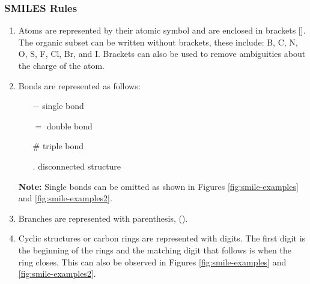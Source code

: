     \subsubsection{SMILES Rules}
        \begin{enumerate}
            \item Atoms are represented by their atomic symbol and are enclosed in brackets []. The organic subset can be written without brackets, these include: B, C, N, O, S, F, Cl, Br, and I. Brackets can also be used to remove ambiguities about the charge of the atom. 
            \item Bonds are represented as follows:
            \begin{itemize}
                \item[$-$] single bond
                \item[$=$] double bond
                \item[$\#$] triple bond
                \item[$.$] disconnected structure
            \end{itemize}
            \textbf{Note:} Single bonds can be omitted as shown in Figures \ref{fig:smile-examples} and \ref{fig:smile-examples2}.
            \item Branches are represented with parenthesis, ().
            \item Cyclic structures or carbon rings are represented with digits. The first digit is the beginning of the rings and the matching digit that follows is when the ring closes. This can also be observed in Figures \ref{fig:smile-examples} and \ref{fig:smile-examples2}.
        \end{enumerate}
